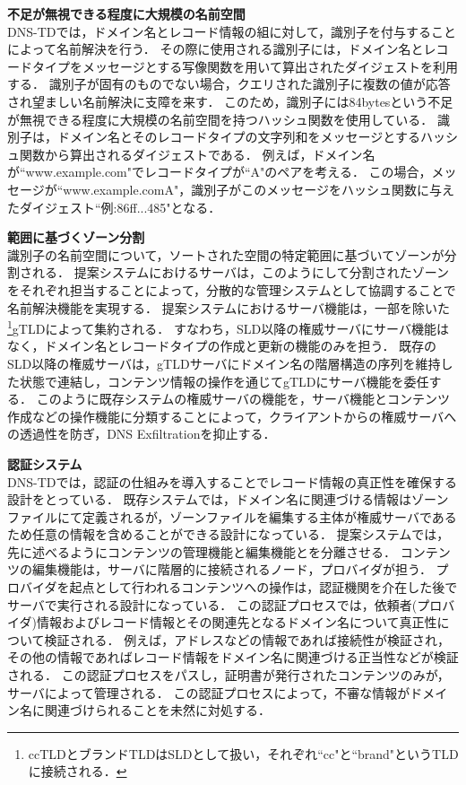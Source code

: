 \hspace{-12pt}\textbf{不足が無視できる程度に大規模の名前空間}\\
\hspace{12pt}DNS-TDでは，ドメイン名とレコード情報の組に対して，識別子を付与することによって名前解決を行う．
その際に使用される識別子には，ドメイン名とレコードタイプをメッセージとする写像関数を用いて算出されたダイジェストを利用する．
識別子が固有のものでない場合，クエリされた識別子に複数の値が応答され望ましい名前解決に支障を来す．
このため，識別子には84bytesという不足が無視できる程度に大規模の名前空間を持つハッシュ関数を使用している．
識別子は，ドメイン名とそのレコードタイプの文字列和をメッセージとするハッシュ関数から算出されるダイジェストである．
例えば，ドメイン名が``www.example.com"でレコードタイプが``A"のペアを考える．
この場合，メッセージが``www.example.comA"，識別子がこのメッセージをハッシュ関数に与えたダイジェスト``例:86ff...485"となる．\newline

\hspace{-12pt}\textbf{範囲に基づくゾーン分割}\\
\hspace{12pt}識別子の名前空間について，ソートされた空間の特定範囲に基づいてゾーンが分割される．
提案システムにおけるサーバは，このようにして分割されたゾーンをそれぞれ担当することによって，分散的な管理システムとして協調することで名前解決機能を実現する．
提案システムにおけるサーバ機能は，一部を除いた\footnote{ccTLDとブランドTLDはSLDとして扱い，それぞれ``cc"と``brand"というTLDに接続される．}gTLDによって集約される．
すなわち，SLD以降の権威サーバにサーバ機能はなく，ドメイン名とレコードタイプの作成と更新の機能のみを担う．
既存のSLD以降の権威サーバは，gTLDサーバにドメイン名の階層構造の序列を維持した状態で連結し，コンテンツ情報の操作を通じてgTLDにサーバ機能を委任する．
このように既存システムの権威サーバの機能を，サーバ機能とコンテンツ作成などの操作機能に分類することによって，クライアントからの権威サーバへの透過性を防ぎ，DNS Exfiltrationを抑止する．\newline

\hspace{-12pt}\textbf{認証システム}\\
\hspace{12pt}DNS-TDでは，認証の仕組みを導入することでレコード情報の真正性を確保する設計をとっている．
既存システムでは，ドメイン名に関連づける情報はゾーンファイルにて定義されるが，ゾーンファイルを編集する主体が権威サーバであるため任意の情報を含めることができる設計になっている．
提案システムでは，先に述べるようにコンテンツの管理機能と編集機能とを分離させる．
コンテンツの編集機能は，サーバに階層的に接続されるノード，プロバイダが担う．
プロバイダを起点として行われるコンテンツへの操作は，認証機関を介在した後でサーバで実行される設計になっている．
この認証プロセスでは，依頼者(プロバイダ)情報およびレコード情報とその関連先となるドメイン名について真正性について検証される．
例えば，アドレスなどの情報であれば接続性が検証され，その他の情報であればレコード情報をドメイン名に関連づける正当性などが検証される．
この認証プロセスをパスし，証明書が発行されたコンテンツのみが，サーバによって管理される．
この認証プロセスによって，不審な情報がドメイン名に関連づけられることを未然に対処する．


